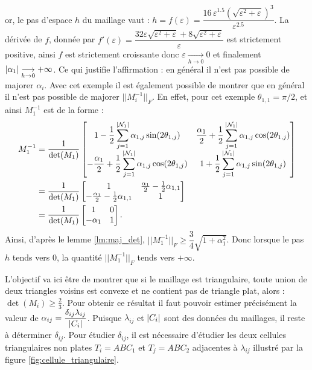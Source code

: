 \documentclass[12pt,a4paper]{article}
\begin{document}
	\vspace{-1cm}
	
	\noindent or, le pas d'espace $h$ du maillage vaut : $h = f(\varepsilon) = \dfrac{16\,\varepsilon^{1.5}\left(\sqrt{\varepsilon^2 + \varepsilon}\right)^3 }{\varepsilon^{2.5}}$. La dérivée de $f$, donnée par $f'(\varepsilon) = \dfrac{32\varepsilon\sqrt{\varepsilon^2+\varepsilon}+8\sqrt{\varepsilon^2+\varepsilon}}{\varepsilon}$ est strictement positive, ainsi $f$ est strictement croissante donc $\varepsilon \underset{h \to 0}\longrightarrow 0$ et finalement $\left\lvert \alpha_1 \right\rvert \underset{h \to 0}\longrightarrow +\infty$. Ce qui justifie l'affirmation : en général il n'est pas possible de majorer $\alpha_i$. Avec cet exemple il est également possible de montrer que en général il n'est pas possible de majorer $|\!|M_i^{-1}|\!|_F$. En effet, pour cet exemple $\theta_{1,1} = \pi/2$, et ainsi $M_1^{-1}$ est de la forme :
	\[
		\begin{aligned}
			M_1^{-1} &= 
		\dfrac1{\det(M_1)}\begin{bmatrix}
			\displaystyle
			 1-\frac12\sum_{j=1}^{\left\lvert \mathcal N_1 \right\rvert} \alpha_{1,j}\sin(2\theta_{1,j}) &\displaystyle \frac{\alpha_1}2+\frac12\sum_{j=1}^{\left\lvert \mathcal N_1 \right\rvert} \alpha_{1,j}\cos(2\theta_{1,j})\\
			\displaystyle-\frac{\alpha_1}2+\frac12\sum_{j=1}^{\left\lvert \mathcal N_1 \right\rvert} \alpha_{1,j}\cos(2\theta_{1,j}) & \displaystyle 1+\frac12\sum_{j=1}^{\left\lvert \mathcal N_1 \right\rvert} \alpha_{1,j}\sin(2\theta_{1,j})
		\end{bmatrix}\\
		&= 
		\dfrac1{\det(M_1)}\begin{bmatrix}
			1 &\frac{\alpha_1}2-\frac12 \alpha_{1,1}\\
			-\frac{\alpha_1}2-\frac12 \alpha_{1,1}& 1
		\end{bmatrix}\\
		&=\dfrac1{\det(M_1)}\begin{bmatrix}
			1 & 0\\
			-\alpha_1& 1
		\end{bmatrix}.
		\end{aligned}
	\]
	Ainsi, d'après le lemme \ref{lm:maj_det}, $|\!|M_1^{-1}|\!|_F \geq \dfrac34 \sqrt{1+\alpha_1^2}$. Donc lorsque le pas $h$ tends vers 0, la quantité $|\!|M_1^{-1}|\!|_F$ tends vers $+ \infty$.
	
	L'objectif va ici être de montrer que si le maillage est triangulaire, toute union de deux triangles voisins est convexe et ne contient pas de triangle plat, alors : $\det(M_i) \geq \frac23$. Pour obtenir ce résultat il faut pouvoir estimer précisément la valeur de $\alpha_{ij} = \dfrac{\delta_{ij}\lambda_{ij}}{\left\lvert C_i \right\rvert}$. Puisque $\lambda_{ij}$ et $\left\lvert C_i \right\rvert$ sont des données du maillages, il reste à déterminer $\delta_{ij}$. Pour étudier $\delta_{ij}$, il est nécessaire d'étudier les deux cellules triangulaires non plates $T_i = ABC_1$ et $T_j = ABC_2$ adjacentes à $\lambda_{ij}$ illustré par la figure \ref{fig:cellule_triangulaire}.
	
\end{document}
